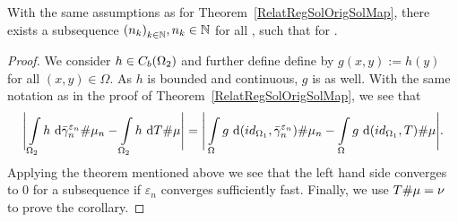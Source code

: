 
\begin{corollary}\label{RelatRegOrigCor}
	With the same assumptions as for Theorem~\ref{RelatRegSolOrigSolMap}, there exists a subsequence ${(n_k)}_{\NinN[k]}, \NinN[n_k]$ for all \NinN[k], such that  for \Ninf.
\end{corollary}

\begin{proof}
	We consider $h \in \CF[b]{\Omega_2}$ and further define define \map[g]{\Omega}{\R} by $g(x, y) := h(y)$ for all $(x, y) \in \Omega$. As $h$ is bounded and continuous, $g$ is as well. With the same notation as in the proof of Theorem~\ref{RelatRegSolOrigSolMap}, we see that
	\[ \Bigg\lvert \int\limits_{\Omega_2} h~\D[{\push[\bar{\gamma}_n^{\varepsilon_n}]{\mu_n}}] - \int\limits_{\Omega_2} h~\D[{\push{\mu}}] \Bigg\rvert = \Bigg\lvert \int\limits_{\Omega} g~\D[{\push[(id_{\Omega_1}, \bar{\gamma}_n^{\varepsilon_n})]{\mu_n}}] - \int\limits_{\Omega} g~\D[{\push[(id_{\Omega_1}, T)]{\mu}}] \Bigg\rvert. \]
	Applying the theorem mentioned above we see that the left hand side converges to $0$ for a subsequence if $\varepsilon_n$ converges sufficiently fast. Finally, we use $\push{\mu} = \nu$ to prove the corollary.
\end{proof}
